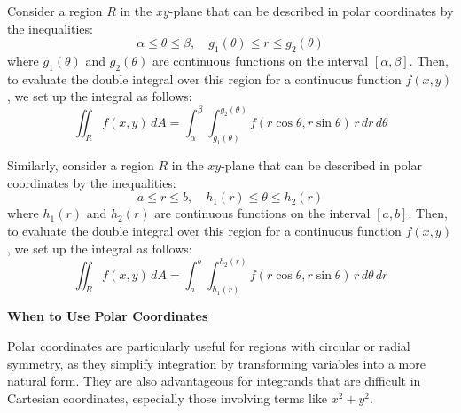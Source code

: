 \documentclass[11pt]{report}
\begin{document}
\begin{definition}
    Consider a region $R$ in the $xy$-plane that can be described in polar coordinates by the inequalities:
    $$
        \alpha \le \theta \le \beta, \quad g_1(\theta) \le r \le g_2(\theta)
    $$
    where $g_1(\theta)$ and $g_2(\theta)$ are continuous functions on the interval $[\alpha, \beta]$. Then, to evaluate the double integral over this region for a continuous function $f(x,y)$, we set up the integral as follows:
    \begin{equation}
        \iint_R f(x,y) \, dA = \int_\alpha^\beta \int_{g_1(\theta)}^{g_2(\theta)} f(r \cos{\theta}, r \sin{\theta}) \, r \, dr \, d\theta
    \end{equation}
\end{definition}

\begin{definition}
    Similarly, consider a region $R$ in the $xy$-plane that can be described in polar coordinates by the inequalities:
    $$
        a \le r \le b, \quad h_1(r) \le \theta \le h_2(r)
    $$
    where $h_1(r)$ and $h_2(r)$ are continuous functions on the interval $[a, b]$. Then, to evaluate the double integral over this region for a continuous function $f(x,y)$, we set up the integral as follows:
    \begin{equation}
        \iint_R f(x,y) \, dA = \int_a^b \int_{h_1(r)}^{h_2(r)} f(r \cos{\theta}, r \sin{\theta}) \, r \, d\theta \, dr
    \end{equation}
\end{definition}

\begin{shaded}
    \textbf{When to Use Polar Coordinates}
    
    Polar coordinates are particularly useful for regions with circular or radial symmetry, as they simplify integration by transforming variables into a more natural form. They are also advantageous for integrands that are difficult in Cartesian coordinates, especially those involving terms like $x^2 + y^2$.
\end{shaded}
\end{document}
